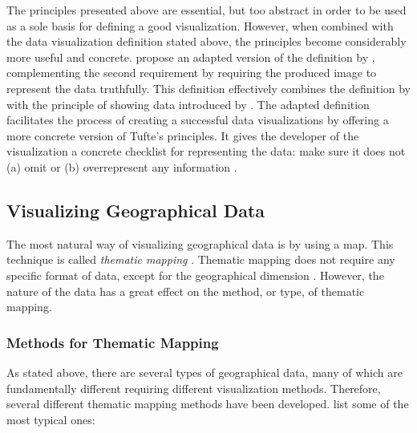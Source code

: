 The principles presented above are essential, but too abstract in order to be used as a sole basis for defining a good visualization. However, when combined with the data visualization definition stated above, the principles become considerably more useful and concrete. \citet{azzam_j-b_2013} propose an adapted version of the definition by \citet{kosara_visualization_2007}, complementing the second requirement by requiring the produced image to represent the data truthfully. This definition effectively combines the definition by \citet{kosara_visualization_2007} with the principle of showing data introduced by \citet{tufte_visual_1986}. The adapted definition facilitates the process of creating a successful data visualizations by offering a more concrete version of Tufte's principles. It gives the developer of the visualization a concrete checklist for representing the data: make sure it does not (a) omit or (b) overrepresent any information \citep{azzam_j-b_2013}.



\subsection{Visualizing Geographical Data}


The most natural way of visualizing geographical data is by using a map\citep[chap.~1]{kraak_cartographic_1998,kraak_cartography_2011}. This technique is called \emph{thematic mapping} \citep[chap.~1]{slocum_thematic_2014}. Thematic mapping does not require any specific format of data, except for the geographical dimension \citep[chap.~1]{kraak_cartography_2011}. However, the nature of the data has a great effect on the method, or type, of thematic mapping.

\subsubsection{Methods for Thematic Mapping}

As stated above, there are several types of geographical data, many of which are fundamentally different requiring different visualization methods. Therefore, several different thematic mapping methods have been developed. \citet[chap.~14-18]{slocum_thematic_2014} list some of the most typical ones: 

